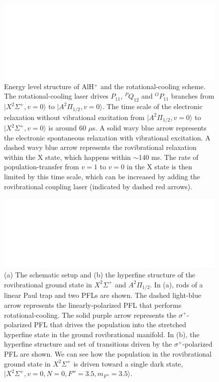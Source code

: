 \documentclass[nofootinbib,aip,jcp,reprint]{revtex4-1}
\begin{document}
\begin{figure}[!htp]
  \centering
  \includegraphics[width=14cm]{level_diagram_parity}
  \caption
  {Energy level structure of AlH$^+$ and the rotational-cooling scheme. The rotational-cooling laser drives $P_{11}$, $^PQ_{12}$ and $^OP_{11}$ branches from $\lvert X^2\Sigma^+, v=0\rangle$ to $\lvert A^2\Pi_{1/2}, v=0\rangle$. The time scale of the electronic relaxation without vibrational excitation from $\lvert A^2\Pi_{1/2}, v=0\rangle$ to $\lvert X^2\Sigma^+, v=0\rangle$ is around 60 $\mu$s. A solid wavy blue arrow represents the electronic spontaneous relaxation with vibrational excitation. A dashed wavy blue arrow represents the rovibrational relaxation within the X state, which happens within $\sim$140 ms. The rate of population-transfer from $v=1$ to $v=0$ in the X state is then limited by this time scale, which can be increased by adding the rovibrational coupling laser (indicated by dashed red arrows).
}\label{level_diagram_parity}
\end{figure}

\begin{figure}[!htp]
  \centering
  \includegraphics[width=14cm]{schematic_setup}
  \caption
  {(a) The schematic setup and (b) the hyperfine structure of the rovibrational ground state in $X^2\Sigma^+$ and $A^2\Pi_{1/2}$. In (a), rods of a linear Paul trap and two PFLs are shown. The dashed light-blue arrow represents the linearly-polarized PFL that performs rotational-cooling. The solid purple arrow represents the $\sigma^+$-polarized PFL that drives the population into the stretched hyperfine state in the ground rovibrational manifold. In (b), the hyperfine structure and set of transitions driven by the $\sigma^+$-polarized PFL are shown. We can see how the population in the rovibrational ground state in $X^2\Sigma^+$ is driven toward a single dark state, $\lvert X^2\Sigma^+, v=0, N=0, F''=3.5, m_{F''}=3.5\rangle$.
}\label{schematic_setup}
\end{figure}
\end{document}
